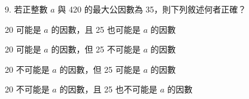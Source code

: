 \documentclass[12pt]{article}
\begin{document}
\begin{problem}
  \item[9.] 若正整數 $a$ 與 420 的最大公因數為 35，則下列敘述何者正確？
  \begin{choices}
    \item 20 可能是 $a$ 的因數，且 25 也可能是 $a$ 的因數
    \item 20 可能是 $a$ 的因數，但 25 不可能是 $a$ 的因數
    \item 20 不可能是 $a$ 的因數，但 25 可能是 $a$ 的因數
    \item 20 不可能是 $a$ 的因數，且 25 也不可能是 $a$ 的因數
  \end{choices}
\end{problem}
\end{document}

